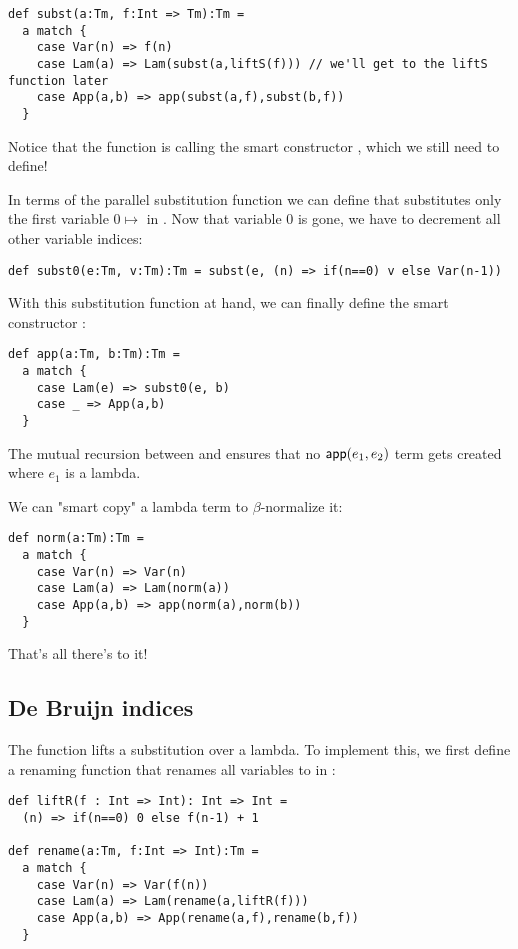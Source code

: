 \begin{lstlisting}
def subst(a:Tm, f:Int => Tm):Tm =
  a match {
    case Var(n) => f(n)
    case Lam(a) => Lam(subst(a,liftS(f))) // we'll get to the liftS function later
    case App(a,b) => app(subst(a,f),subst(b,f))
  }
\end{lstlisting}

Notice that the  function is calling the smart constructor , which we still need to define!

In terms of the parallel substitution function  we can define  that substitutes only the first variable $0 \mapsto$  in .
Now that variable $0$ is gone, we have to decrement all other variable indices:

\begin{lstlisting}
def subst0(e:Tm, v:Tm):Tm = subst(e, (n) => if(n==0) v else Var(n-1))
\end{lstlisting}

With this substitution function at hand, we can finally define the smart constructor :

\begin{lstlisting}
def app(a:Tm, b:Tm):Tm =
  a match {
    case Lam(e) => subst0(e, b)
    case _ => App(a,b)
  }
\end{lstlisting}

The mutual recursion between  and  ensures that no $\mathsf{app}(e_1,e_2)$ term gets created where $e_1$ is a lambda.

We can "smart copy" a lambda term to $\beta$-normalize it:

\begin{lstlisting}
def norm(a:Tm):Tm =
  a match {
    case Var(n) => Var(n)
    case Lam(a) => Lam(norm(a))
    case App(a,b) => app(norm(a),norm(b))
  }
\end{lstlisting}

That's all there's to it!

\subsection{De Bruijn indices}

The  function lifts a substitution over a lambda.
To implement this, we first define a renaming function  that renames all variables  to  in :

\begin{lstlisting}
def liftR(f : Int => Int): Int => Int =
  (n) => if(n==0) 0 else f(n-1) + 1

def rename(a:Tm, f:Int => Int):Tm =
  a match {
    case Var(n) => Var(f(n))
    case Lam(a) => Lam(rename(a,liftR(f)))
    case App(a,b) => App(rename(a,f),rename(b,f))
  }
\end{lstlisting}

